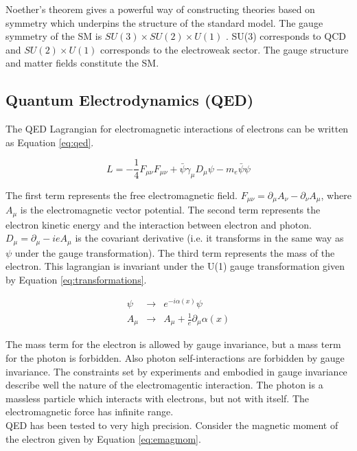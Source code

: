 Noether's theorem gives a powerful way of constructing theories based on 
symmetry which underpins the structure of the standard model. The gauge
symmetry of the SM is $SU(3)\times SU(2)\times U(1)$ \cite{rubakov,
aitchison_and_hey}. SU(3) corresponds to QCD and $SU(2)\times U(1)$ corresponds 
to the electroweak sector. The gauge structure and matter fields constitute the 
SM.

\subsection{Quantum Electrodynamics (QED)}

The QED Lagrangian for electromagnetic interactions of electrons can be written 
as Equation \ref{eq:qed}.

\begin{equation}
L = -\frac{1}{4}F_{\mu\nu}F_{\mu\nu} + \bar{\psi}\gamma_{\mu}D_{\mu}\psi
- m_{e}\bar{\psi}\psi
\label{eq:qed}
\end{equation} 

The first term represents the free electromagnetic field. $F_{\mu\nu} = 
\partial_{\mu}A_{\nu} - \partial_{\nu}A_{\mu}$, where $A_{\mu}$ is the 
electromagnetic vector potential. The second term represents the electron 
kinetic energy and the interaction between electron and photon. $D_{\mu} = 
\partial_{\mu} - ieA_{\mu}$ is the covariant derivative (i.e. it transforms in 
the same way as $\psi$ under the gauge transformation). The third term 
represents the mass of the electron. This lagrangian is invariant under the U(1) 
gauge transformation given by Equation \ref{eq:transformations}.

\begin{eqnarray}
\psi &\rightarrow& e^{-i\alpha(x)}\psi \\
A_{\mu}   &\rightarrow& A_{\mu} + \frac{1}{e}\partial_{\mu}\alpha(x)
\label{eq:transformations}
\end{eqnarray}

The mass term for the electron is allowed by gauge invariance, but a mass term for 
the photon is forbidden. Also photon self-interactions are forbidden by gauge 
invariance. The constraints set by experiments and embodied in gauge invariance 
describe well the nature of the electromagentic interaction. The photon is 
a massless particle which interacts with electrons, but not with itself. The 
electromagnetic force has infinite range. \\

QED has been tested to very high precision. Consider the magnetic moment of the
electron given by Equation \ref{eq:emagmom}.

